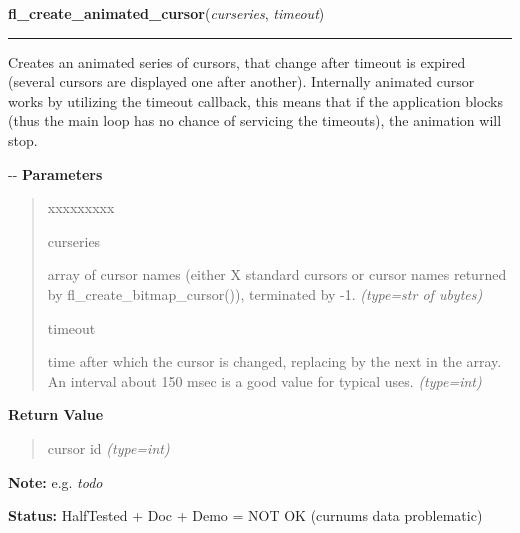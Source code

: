     \label{xformslib:flcursor:fl_create_animated_cursor}

    \vspace{0.5ex}

\hspace{.8\funcindent}\begin{boxedminipage}{\funcwidth}

    \raggedright \textbf{fl\_create\_animated\_cursor}(\textit{curseries}, \textit{timeout})

    \vspace{-1.5ex}

    \rule{\textwidth}{0.5\fboxrule}
\setlength{\parskip}{2ex}

Creates an animated series of cursors, that change after timeout
is expired (several cursors are displayed one after another). Internally
animated cursor works by utilizing the timeout callback, this means that
if the application blocks (thus the main loop has no chance of servicing
the timeouts), the animation will stop.

-{}-
\setlength{\parskip}{1ex}
      \textbf{Parameters}
      \vspace{-1ex}

      \begin{quote}
        \begin{Ventry}{xxxxxxxxx}

          \item[curseries]


array of cursor names (either X standard cursors or cursor names
returned by fl\_create\_bitmap\_cursor()), terminated by -1.
            {\it (type=str of ubytes)}

          \item[timeout]


time after which the cursor is changed, replacing by the next in
the array. An interval about 150 msec is a good value for typical
uses.
            {\it (type=int)}

        \end{Ventry}

      \end{quote}

      \textbf{Return Value}
    \vspace{-1ex}

      \begin{quote}

cursor id
      {\it (type=int)}

      \end{quote}

\textbf{Note:} 
e.g. \emph{todo}


\textbf{Status:} 
HalfTested + Doc + Demo = NOT OK (curnums data problematic)


    \end{boxedminipage}

